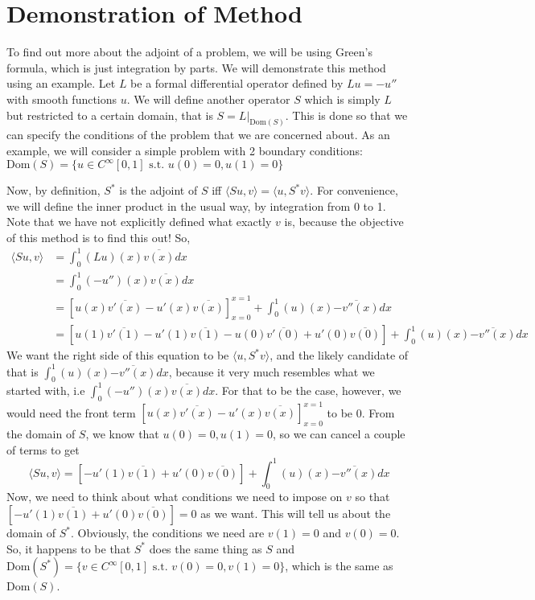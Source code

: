 \documentclass[11pt,reqno,oneside,a4paper]{article}
\begin{document}
	
\section*{Demonstration of Method}
To find out more about the adjoint of a problem, we will be using Green's formula, which is just integration by parts. We will demonstrate this method using an example. Let $L$ be a formal differential operator defined by $Lu = -u''$ with smooth functions $u$. We will define another operator $S$ which is simply $L$ but restricted to a certain domain, that is $S = L|_{\text{Dom}(S)}$. This is done so that we can specify the conditions of the problem that we are concerned about. As an example, we will consider a simple problem with 2 boundary conditions:
$\text{Dom}(S) = \{u\in C^\infty[0,1] \text{ s.t. } u(0) = 0, u(1) = 0\}$

Now, by definition, $S^*$ is the adjoint of $S$ iff $\langle Su,v \rangle = \langle u,S^*v \rangle.$ For convenience, we will define the inner product in the usual way, by integration from 0 to 1. Note that we have not explicitly defined what exactly $v$ is, because the objective of this method is to find this out! So,
\begin{align*}
	\langle Su,v \rangle &= \int_{0}^{1}(Lu)(x)\overline{v(x)}dx \\
	&= \int_{0}^{1}(-u'')(x)\overline{v(x)}dx \\
	&= \left[u(x)\overline{v'(x)} - u'(x)\overline{v(x)}\right]_{x = 0}^{x=1} + \int_{0}^{1}(u)(x)\overline{-v''(x)}dx\\
	&= \left[u(1)\overline{v'(1)} - u'(1)\overline{v(1)} -u(0)\overline{v'(0)} + u'(0)\overline{v(0)}\right] + \int_{0}^{1}(u)(x)\overline{-v''(x)}dx
\end{align*}
We want the right side of this equation to be $\langle u,S^*v \rangle$, and the likely candidate of that is $\int_{0}^{1}(u)(x)\overline{-v''(x)}dx$, because it very much resembles what we started with, i.e $\int_{0}^{1}(-u'')(x)\overline{v(x)}dx$. For that to be the case, however, we would need the front term $\left[u(x)\overline{v'(x)} - u'(x)\overline{v(x)}\right]_{x = 0}^{x=1}$ to be 0. From the domain of $S$, we know that $u(0) = 0, u(1) = 0$, so we can cancel a couple of terms to get
$$ \langle Su,v \rangle = \left[ - u'(1)\overline{v(1)} + u'(0)\overline{v(0)}\right] + \int_{0}^{1}(u)(x)\overline{-v''(x)}dx$$
Now, we need to think about what conditions we need to impose on $v$ so that $\left[ - u'(1)\overline{v(1)} + u'(0)\overline{v(0)}\right] = 0$ as we want. This will tell us about the domain of $S^*$. Obviously, the conditions we need are $v(1) = 0$ and $v(0) = 0$. So, it happens to be that $S^*$ does the same thing as $S$ and $\text{Dom}(S^*) = \{v\in C^\infty[0,1] \text{ s.t. } v(0) = 0, v(1) = 0\}$, which is the same as $\text{Dom}(S)$.
\end{document}
